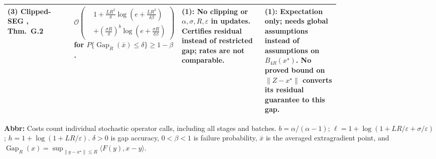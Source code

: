 \begin{table}[tp]
\begin{threeparttable}
\begin{tabularx}{\linewidth}{@{}>{\raggedright\arraybackslash}p{0.20\linewidth}>{\raggedright\arraybackslash}p{0.32\linewidth}>{\raggedright\arraybackslash}p{0.25\linewidth}>{\raggedright\arraybackslash}X@{}}
\midrule
\textbf{(3)} Clipped-SEG \citep{tailSadievV2}, Thm.~G.2 & $\mathcal{O}\!\left(\begin{aligned}&1+\frac{LR^2}{\delta}\log\!\left(e+\frac{LR^2}{\delta\beta}\right)\\&+\left(\frac{\sigma R}{\delta}\right)^b\log\!\left(e+\frac{\sigma R}{\delta\beta}\right)\end{aligned}\right)$ for $P\{\operatorname{Gap}_R(\bar x)\le\delta\}\ge1-\beta$. & \textbf{(1)}: No clipping or $\alpha,\sigma,R,\varepsilon$ in updates. Certifies residual instead of restricted gap; rates are not comparable. & \textbf{(1)}: Expectation only; needs global assumptions instead of assumptions on $B_{4R}(x^\star)$. No proved bound on $\|Z-x^\star\|$ converts its residual guarantee to this gap. \\
\bottomrule
\end{tabularx}
\begin{tablenotes}[flushleft]\footnotesize
\item[] \textbf{Abbr:} Costs count individual stochastic operator calls, including all stages and batches. $b=\alpha/(\alpha-1)$; $\ell=1+\log(1+LR/\varepsilon+\sigma/\varepsilon)$; $h=1+\log(1+LR/\varepsilon)$. $\delta>0$ is gap accuracy, $0<\beta<1$ is failure probability, $\bar x$ is the averaged extragradient point, and $\operatorname{Gap}_R(x)=\sup_{\|y-x^\star\|\le R}\langle F(y),x-y\rangle$. 
\end{tablenotes}
\end{threeparttable}
\end{table}
\clearpage
